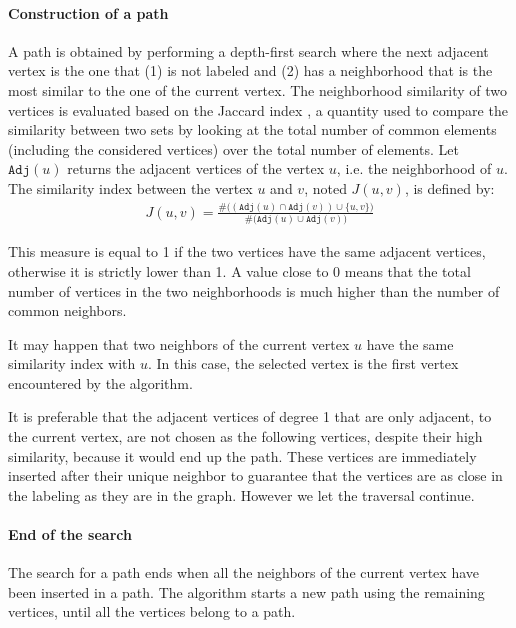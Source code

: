 \documentclass{scrartcl}
\theoremstyle{plain}
\begin{document}
\paragraph{Construction of a path}

A path is obtained by performing a depth-first search where the next adjacent 
vertex is the one that (1) is not labeled and (2) has a neighborhood that is the 
most similar to the one of the current vertex.  The neighborhood similarity of 
two vertices is evaluated based on the Jaccard index \cite{Jaccard1901}, a 
quantity used to compare the similarity between two sets by looking at the total 
number of common elements (including the considered vertices) over the total 
number of elements. Let $\texttt{Adj}(u)$ returns the adjacent vertices of the 
vertex $u$, i.e. the neighborhood of $u$. The similarity index between the 
vertex $u$ and $v$, noted $J(u,v)$, is defined by:
\begin{align}
\label{eq:jaccard}
 J(u,v) = \frac{\#\Big((\texttt{Adj}(u) \cap  
\texttt{Adj}(v))\cup\{u,v\}\Big)}{\#\Big(\texttt{Adj}(u) 
\cup \texttt{Adj}(v)\Big)} 
\end{align}

This measure is equal to 1 if the two vertices have the same adjacent vertices, 
otherwise it is strictly lower than 1. A value close to 0 means that the total 
number of vertices in the two neighborhoods is much higher than the number of 
common neighbors.

It may happen that two neighbors of the current vertex $u$ have the same 
similarity index with $u$. In this case, the selected vertex is the first vertex 
encountered by the algorithm.

It is preferable that the adjacent vertices of degree 1 that are only adjacent, 
to the current vertex, are not chosen as the following vertices, despite their 
high similarity, because it would end up the path. These vertices are 
immediately inserted after their unique neighbor to guarantee that the vertices 
are as close in the labeling as they are in the graph. However we let the 
traversal 
continue.

\paragraph{End of the search}

The search for a path ends when all the neighbors of the current vertex have 
been inserted in a path. The algorithm starts a new path using the remaining 
vertices, until all the vertices belong to a path.
\end{document}
